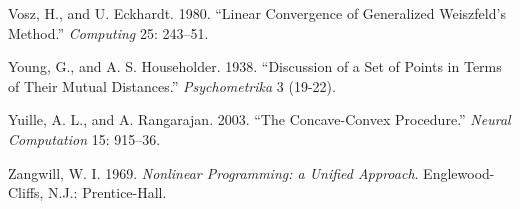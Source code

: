 \documentclass[
  12pt,
  letterpaper,
  DIV=11,
  numbers=noendperiod]{scrartcl}
\newlength{\cslhangindent}
\newenvironment{CSLReferences}[2] %
 {\begin{list}{}{%
  \setlength{\itemindent}{0pt}
  \setlength{\leftmargin}{0pt}
  \setlength{\parsep}{0pt}
  \ifodd #1
   \setlength{\leftmargin}{\cslhangindent}
   \setlength{\itemindent}{-1\cslhangindent}
  \fi
  \setlength{\itemsep}{#2\baselineskip}}}
 {\end{list}}
\begin{document}
\begin{CSLReferences}{1}{0}
Vosz, H., and U. Eckhardt. 1980. {``{Linear Convergence of Generalized
{W}eiszfeld's Method}.''} \emph{Computing} 25: 243--51.

Young, G., and A. S. Householder. 1938. {``{Discussion of a Set of
Points in Terms of Their Mutual Distances}.''} \emph{Psychometrika} 3
(19-22).

Yuille, A. L., and A. Rangarajan. 2003. {``{The Concave-Convex
Procedure}.''} \emph{Neural Computation} 15: 915--36.

Zangwill, W. I. 1969. \emph{{Nonlinear Programming: a Unified
Approach}}. Englewood-Cliffs, N.J.: Prentice-Hall.

\end{CSLReferences}
\end{document}
